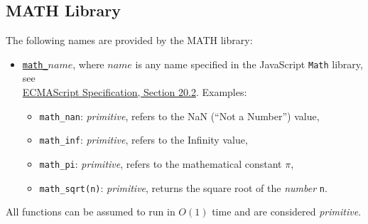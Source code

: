 \subsection*{MATH Library}


The following names are provided by the MATH library:
\begin{itemize}
\item \href{https://sourceacademy.org/sicpjs/1.1.4\#p8}{\lstinline{math_}$\textit{name}$},
where $\textit{name}$ is any name specified in the
JavaScript
\texttt{Math} library, see\\
\href{https://www.ecma-international.org/ecma-262/9.0/index.html\#sec-math-object}{\color{DarkBlue}ECMAScript Specification, Section 20.2}. Examples:
\begin{itemize}
\item \verb#math_nan#: \textit{primitive}, refers to the NaN (``Not a Number'') value,
\item \verb#math_inf#: \textit{primitive}, refers to the Infinity value,
\item \verb#math_pi#: \textit{primitive}, refers to the mathematical constant $\pi$,
\item \verb#math_sqrt#\texttt{(n)}: \textit{primitive}, returns the square root of the \emph{number} \texttt{n}.
\end{itemize}
\end{itemize}
All functions can be assumed to run in $O(1)$ time and are considered
\textit{primitive}.
